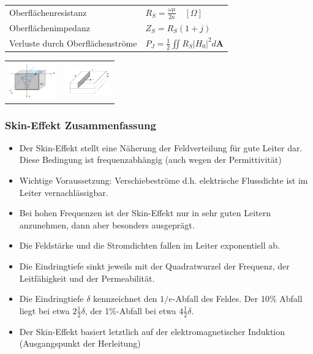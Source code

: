 \documentclass[english]{latex4ei/latex4ei_sheet}
\begin{document}
\begin{sectionbox}
    \begin{tabular*}{\columnwidth}{ll}
        Oberflächenresistanz & $R_S = \frac{\omega\mu}{2\kappa} \quad [\Omega]$ \\
        Oberflächenimpedanz & $Z_S = R_S(1+j)$ \\
        Verluste durch Oberflächenströme & $P_J = \frac{1}{2} \iint R_S |H_0|^2 d\mathbf{A}$ \\
    \end{tabular*}
    \begin{tabular*}{\columnwidth}{ll}
        \includegraphics[width = 2cm]{./img/skin_effekt.png} & \includegraphics[width = 2cm]{./img/skin_effekt_verlust.png}\\
    \end{tabular*}
\end{sectionbox}
\begin{sectionbox}
    \subsubsection{Skin-Effekt Zusammenfassung}
    \begin{itemize}
        \item Der Skin-Effekt stellt eine Näherung der Feldverteilung für gute Leiter dar. Diese Bedingung ist frequenzabhängig (auch wegen der Permittivität)
        \item Wichtige Voraussetzung: Verschiebeströme d.h. elektrische Flussdichte ist im Leiter vernachlässigbar.
        \item Bei hohen Frequenzen ist der Skin-Effekt nur in sehr guten Leitern anzunehmen, dann aber besonders ausgeprägt.
        \item Die Feldstärke und die Stromdichten fallen im Leiter exponentiell ab.
        \item Die Eindringtiefe sinkt jeweils mit der Quadratwurzel der Frequenz, der Leitfähigkeit und der Permeabilität.
        \item Die Eindringtiefe $\delta$ kennzeichnet den $1/e$-Abfall des Feldes. Der 10\% Abfall liegt bei etwa $2 \frac{1}{2} \delta$, der 1\%-Abfall bei etwa $4 \frac{1}{2} \delta$.
        \item Der Skin-Effekt basiert letztlich auf der elektromagnetischer Induktion (Ausgangspunkt der Herleitung)
    \end{itemize}
\end{sectionbox}
\end{document}
